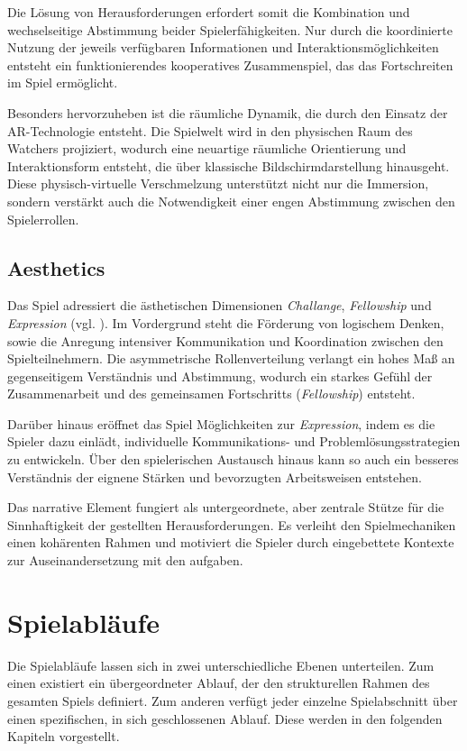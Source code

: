 Die Lösung von Herausforderungen erfordert somit die Kombination und wechselseitige Abstimmung beider Spielerfähigkeiten. Nur durch die koordinierte Nutzung der jeweils verfügbaren Informationen und Interaktionsmöglichkeiten entsteht ein funktionierendes kooperatives Zusammenspiel, das das Fortschreiten im Spiel ermöglicht.

Besonders hervorzuheben ist die räumliche Dynamik, die durch den Einsatz der \ac{AR}-Technologie entsteht. Die Spielwelt wird in den physischen Raum des Watchers projiziert, wodurch eine neuartige räumliche Orientierung und Interaktionsform entsteht, die über klassische Bildschirmdarstellung hinausgeht. Diese physisch-virtuelle Verschmelzung unterstützt nicht nur die Immersion, sondern verstärkt auch die Notwendigkeit einer engen Abstimmung zwischen den Spielerrollen.

\subsection{Aesthetics}

Das Spiel adressiert die ästhetischen Dimensionen \textit{Challange}, \textit{Fellowship} und \textit{Expression} (vgl. \citealp[S. 3]{hunicke_mda_2004}). Im Vordergrund steht die Förderung von logischem Denken, sowie die Anregung intensiver Kommunikation und Koordination zwischen den Spielteilnehmern. Die asymmetrische Rollenverteilung verlangt ein hohes Maß an gegenseitigem Verständnis und Abstimmung, wodurch ein starkes Gefühl der Zusammenarbeit und des gemeinsamen Fortschritts (\textit{Fellowship}) entsteht.

Darüber hinaus eröffnet das Spiel Möglichkeiten zur \textit{Expression}, indem es die Spieler dazu einlädt, individuelle Kommunikations- und Problemlösungsstrategien zu entwickeln. Über den spielerischen Austausch hinaus kann so auch ein besseres Verständnis der eignene Stärken und bevorzugten Arbeitsweisen entstehen.

Das narrative Element fungiert als untergeordnete, aber zentrale Stütze für die Sinnhaftigkeit der gestellten Herausforderungen. Es verleiht den Spielmechaniken einen kohärenten Rahmen und motiviert die Spieler durch eingebettete Kontexte zur Auseinandersetzung mit den aufgaben.

\section{Spielabläufe}

Die Spielabläufe lassen sich in zwei unterschiedliche Ebenen unterteilen. Zum einen existiert ein übergeordneter Ablauf, der den strukturellen Rahmen des gesamten Spiels definiert. Zum anderen verfügt jeder einzelne Spielabschnitt über einen spezifischen, in sich geschlossenen Ablauf. Diese werden in den folgenden Kapiteln vorgestellt.

